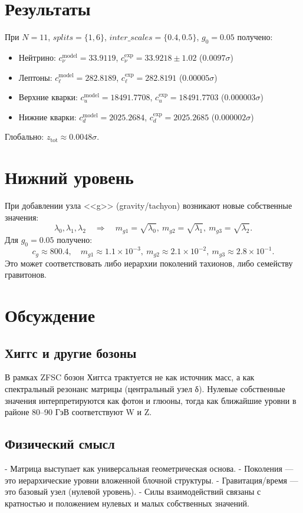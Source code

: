 \documentclass[12pt,a4paper]{article}
\begin{document}
\section{Результаты}
При $N=11$, $splits=\{1,6\}$, $inter\_scales=\{0.4,0.5\}$, $g_0=0.05$ получено:

\begin{itemize}
  \item Нейтрино: $c_\nu^{\text{model}} = 33.9119$, $c_\nu^{\text{exp}} = 33.9218 \pm 1.02$ ($0.0097\sigma$)
  \item Лептоны: $c_\ell^{\text{model}} = 282.8189$, $c_\ell^{\text{exp}} = 282.8191$ ($0.00005\sigma$)
  \item Верхние кварки: $c_u^{\text{model}} = 18491.7708$, $c_u^{\text{exp}} = 18491.7703$ ($0.000003\sigma$)
  \item Нижние кварки: $c_d^{\text{model}} = 2025.2684$, $c_d^{\text{exp}} = 2025.2685$ ($0.000002\sigma$)
\end{itemize}

Глобально: $z_{\text{tot}} \approx 0.0048\sigma$. 

\section{Нижний уровень}
При добавлении узла <<g>> (gravity/tachyon) возникают новые собственные значения:
\[
\lambda_0, \lambda_1, \lambda_2 \quad \Rightarrow \quad 
m_{g1} = \sqrt{\lambda_0}, \ m_{g2} = \sqrt{\lambda_1}, \ m_{g3} = \sqrt{\lambda_2}.
\]
Для $g_0=0.05$ получено:
\[
c_g \approx 800.4, \quad m_{g1} \approx 1.1 \times 10^{-3}, \ m_{g2} \approx 2.1 \times 10^{-2}, \ m_{g3} \approx 2.8 \times 10^{-1}.
\]
Это может соответствовать либо иерархии поколений тахионов, либо семейству гравитонов.

\section{Обсуждение}
\subsection{Хиггс и другие бозоны}
В рамках ZFSC бозон Хиггса трактуется не как источник масс, а как спектральный резонанс матрицы (центральный узел δ). 
Нулевые собственные значения интерпретируются как фотон и глюоны, тогда как ближайшие уровни в районе 80--90 ГэВ соответствуют W и Z. 

\subsection{Физический смысл}
- Матрица выступает как универсальная геометрическая основа.  
- Поколения --- это иерархические уровни вложенной блочной структуры.  
- Гравитация/время --- это базовый узел (нулевой уровень).  
- Силы взаимодействий связаны с кратностью и положением нулевых и малых собственных значений.  
\end{document}

